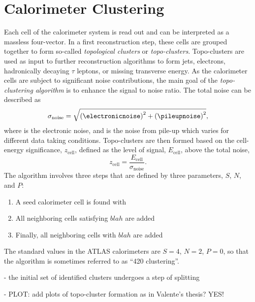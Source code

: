 \section{Calorimeter Clustering}
Each cell of the calorimeter system is read out and can be interpreted as a massless four-vector. In a first reconstruction step, these cells are grouped together to form so-called \emph{topological clusters} or \emph{topo-clusters}. Topo-clusters are used as input to further reconstruction algorithms to form jets, electrons, hadronically decaying $\tau$ leptons, or missing transverse energy.
As the calorimeter cells are subject to significant noise contributions, the main goal of the \emph{topo-clustering algorithm} is to enhance the signal to noise ratio. The total noise can be described as
\begin{equation}
    \sigma_{\text{noise}} = \sqrt{ \left( \electronicnoise  \right)^2  + \left( \pileupnoise  \right)^2 },
\end{equation}
where \electronicnoise is the electronic noise, and \pileupnoise is the noise from pile-up which varies for different data taking conditions.
Topo-clusters are then formed based on the cell-energy significance, $z_{\text{cell}}$, defined as the level of signal, $E_{\text{cell}}$, above the total noise,
\begin{equation}
    z_{\text{cell}} = \frac{E_{\text{cell}}}{\sigma_{\text{noise}}}.
\end{equation}
The algorithm involves three steps that are defined by three parameters, $S$, $N$, and $P$:
\begin{enumerate}
    \item A seed calorimeter cell is found with
    \item All neighboring cells satisfying $blah$ are added
    \item Finally, all neighboring cells with $blah$ are added
\end{enumerate}
The standard values in the ATLAS calorimeters are $S = 4$, $N = 2$, $P = 0$, so that the algorithm is sometimes referred to as ``420 clustering''.

- the initial set of identified clusters undergoes a step of splitting

- PLOT: add plots of topo-cluster formation as in Valente's thesis? YES!

